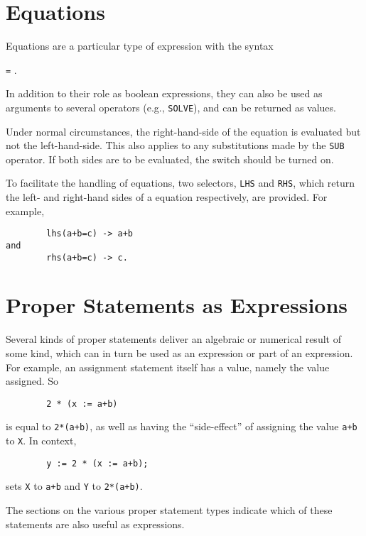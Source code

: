 \section{Equations}

Equations are a particular type of expression with the syntax
\begin{syntax}
       \texttt{=} .
\end{syntax}
In addition to their role as boolean expressions, they can also be used as
arguments to several operators (e.g., \texttt{SOLVE}), and can be
returned as values.

\hypertarget{switch:EVALLHSEQP}{}
Under normal circumstances, the right-hand-side of the equation is
evaluated but not the left-hand-side.  This also applies to any substitutions
made by the \texttt{SUB} operator.  If both sides are to be
evaluated, the switch  should be
turned on.

\hypertarget{operator:LHS}{}
\hypertarget{operator:RHS}{}
To facilitate the handling of equations, two selectors, \texttt{LHS}
 and \texttt{RHS}, which return the left- and
right-hand sides of a equation respectively, are provided.
For example,
\begin{verbatim}
        lhs(a+b=c) -> a+b
and
        rhs(a+b=c) -> c.
\end{verbatim}

\section{Proper Statements as Expressions}

Several kinds of proper statements deliver
an algebraic or numerical result of some kind, which can in turn be used as
an expression or part of an expression.  For example, an assignment
statement itself has a value, namely the value assigned.  So
\begin{verbatim}
        2 * (x := a+b)
\end{verbatim}
is equal to \texttt{2*(a+b)}, as well as having the ``side-effect'' of assigning the value \texttt{a+b} to \texttt{X}.  In context,
\begin{verbatim}
        y := 2 * (x := a+b);
\end{verbatim}
sets \texttt{X} to \texttt{a+b} and \texttt{Y} to \texttt{2*(a+b)}.

The sections on the various proper statement types
indicate which of these statements are also useful as expressions.

